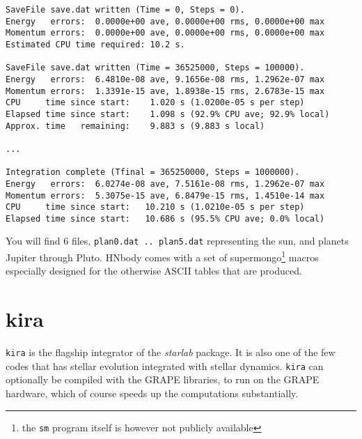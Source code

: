 \begin{verbatim}
SaveFile save.dat written (Time = 0, Steps = 0).
Energy   errors:  0.0000e+00 ave, 0.0000e+00 rms, 0.0000e+00 max
Momentum errors:  0.0000e+00 ave, 0.0000e+00 rms, 0.0000e+00 max
Estimated CPU time required: 10.2 s.
 
SaveFile save.dat written (Time = 36525000, Steps = 100000).
Energy   errors:  6.4810e-08 ave, 9.1656e-08 rms, 1.2962e-07 max
Momentum errors:  1.3391e-15 ave, 1.8938e-15 rms, 2.6783e-15 max
CPU     time since start:    1.020 s (1.0200e-05 s per step)
Elapsed time since start:    1.098 s (92.9% CPU ave; 92.9% local)
Approx. time   remaining:    9.883 s (9.883 s local)
 
...
 
Integration complete (Tfinal = 365250000, Steps = 1000000).
Energy   errors:  6.0274e-08 ave, 7.5161e-08 rms, 1.2962e-07 max
Momentum errors:  5.3075e-15 ave, 6.8479e-15 rms, 1.4510e-14 max
CPU     time since start:   10.210 s (1.0210e-05 s per step)
Elapsed time since start:   10.686 s (95.5% CPU ave; 0.0% local)

\end{verbatim}\normalsize

You will find 6 files, {\tt plan0.dat .. plan5.dat} representing
the sun, and planets Jupiter through Pluto. HNbody comes with a
set of supermongo\footnote{the {\tt sm} program itself 
is however not publicly
available} macros especially  designed for the
otherwise ASCII tables that are produced.

\section{kira}

{\tt kira} is the flagship integrator of the {\it starlab} package. It is also
one of the few codes that has stellar evolution integrated with stellar
dynamics. {\tt kira} can optionally be compiled with the GRAPE libraries,
to run on the GRAPE hardware, which of course speeds up the computations 
substantially.

